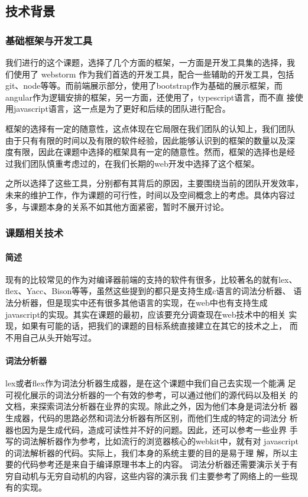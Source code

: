 \subsection{技术背景}
\subsubsection{基础框架与开发工具}
我们进行的这个课题，选择了几个方面的框架，一方面是开发工具集的选择，我
们使用了 webstorm 作为我们首选的开发工具，配合一些辅助的开发工具，包括
git、node等等。而前端展示部分，使用了bootstrap作为基础的展示框架，而
angular作为逻辑安排的框架，另一方面，还使用了，typescript语言，而不直
接使用javascript语言，这一点是为了更好和后续的团队进行配合。

框架的选择有一定的随意性，这点体现在它局限在我们团队的认知上，我们团队
由于只有有限的时间以及有限的软件经验，因此能够认识到的框架的数量以及深
度有限，因此在课题中选择的框架具有一定的随意性。然而，框架的选择也是经
过我们团队慎重考虑过的，在我们长期的web开发中选择了这个框架。

之所以选择了这些工具，分别都有其背后的原因，主要围绕当前的团队开发效率，
未来的维护工作，作为课题的可行性，时间以及空间概念上的考虑。具体内容过
多，与课题本身的关系不如其他方面紧密，暂时不展开讨论。
\subsubsection{课题相关技术}
\paragraph{简述} 
现有的比较常见的作为对编译器前端的支持的软件有很多，比较著名的就有lex、
flex、Yacc、Bison等等，虽然这些提到的都只是支持生成c语言的词法分析器、
语法分析器，但是现实中还有很多其他语言的实现，在web中也有支持生成
javascript的实现。其实在课题的最初，应该要充分调查现在web技术中的相关
实现，如果有可能的话，把我们的课题的目标系统直接建立在其它的技术之上，
而不用自己从头开始写过。
\paragraph{词法分析器} 
lex或者flex作为词法分析器生成器，是在这个课题中我们自己去实现一个能满
足可视化展示的词法分析器的一个有效的参考，可以通过他们的源代码以及相关
的文档，来探索词法分析器在业界的实现。除此之外，因为他们本身是词法分析
器生成器，代码的思路必然和词法分析器有所区别，而他们生成的特定的词法分
析器也因为是生成代码，造成可读性并不好的问题。因此，还可以参考一些业界
手写的词法解析器作为参考，比如流行的浏览器核心的webkit中，就有对
javascript的词法解析器的代码。实际上，我们本身的系统主要的目的是易于理
解，所以主要的代码参考还是来自于编译原理\cite{compiler}书本上的内容。
词法分析器还需要演示关于有穷自动机与无穷自动机的内容，这些内容的演示我
们主要参考了网络上的一些现有的实现。
